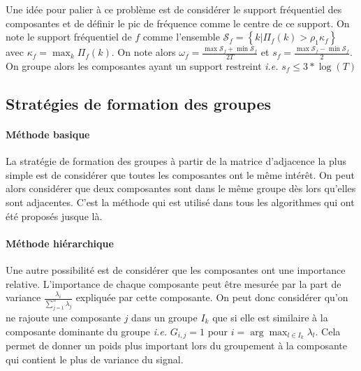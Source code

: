 \documentclass{gretsi}
\begin{document}
    Une idée pour palier à ce problème est de considérer le support fréquentiel des composantes et de définir le pic de fréquence comme le centre de ce support. On note le support fréquentiel de $f$ comme l'ensemble $\mathcal S_f = \left \{ k | \Pi_f(k) > \rho_1 \kappa_f \right \}$ avec $\kappa_f = \max_k \Pi_f(k)$. On note alors $\omega_f = \frac{\max \mathcal S_f + \min \mathcal S_f }{2 T}$ et $s_f = \frac{\max \mathcal S_f - \min \mathcal S_f }{2}$. On groupe alors les composantes ayant un support restreint \emph{i.e.} $s_f \le 3*\log(T)$



\subsection{Stratégies de formation des groupes}
\label{sub:clust}


\paragraph{Méthode basique}
La stratégie de formation des groupes à partir de la matrice d'adjacence la plus simple est de considérer que toutes les composantes ont le même intérêt. On peut alors considérer que deux composantes sont dans le même groupe dès lors qu'elles sont adjacentes. C'est la méthode qui est utilisé dans tous les algorithmes qui ont été proposés jusque là.\\



\paragraph{Méthode hiérarchique}
Une autre possibilité est de considérer que les composantes ont une importance relative. L'importance de chaque composante peut être mesurée par la part de variance $\frac{\lambda_i}{\sum_{j=1}^n \lambda_j}$ expliquée par cette composante. On peut donc considérer qu'on ne rajoute une composante $j$ dans un groupe $I_k$ que si elle est similaire à la composante dominante du groupe \emph{ i.e. } $G_{i, j} = 1$ pour $i = \arg\max_{l \in I_k} \lambda_l$. Cela permet de donner un poids plus important lors du groupement à la composante qui contient le plus de variance du signal.
\end{document}
